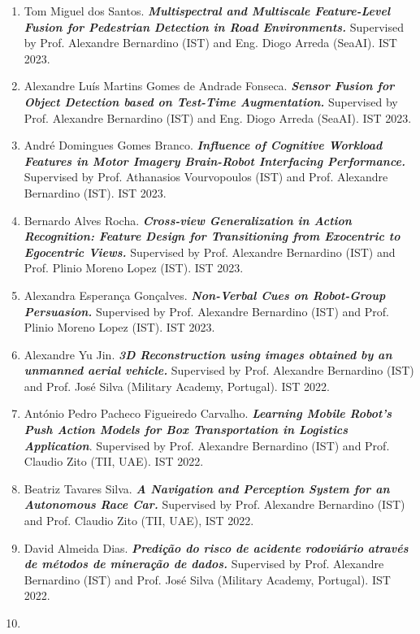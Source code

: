 \begin{enumerate}
{{  Mechanics.}} Supervised by Prof. Alexandre Bernardino (IST) and Prof.
  Rui Ferreira (IST). IST 2023.
\item
  Tom Miguel dos Santos. \emph{\textbf{Multispectral and Multiscale
  Feature-Level Fusion for Pedestrian Detection in Road Environments.}}
  Supervised by Prof. Alexandre Bernardino (IST) and Eng. Diogo Arreda
  (SeaAI). IST 2023.
\item
  Alexandre Luís Martins Gomes de Andrade Fonseca. \emph{\textbf{Sensor
  Fusion for Object Detection based on Test-Time Augmentation.}}
  Supervised by Prof. Alexandre Bernardino (IST) and Eng. Diogo Arreda
  (SeaAI). IST 2023.
\item
  André Domingues Gomes Branco. \emph{\textbf{Influence of Cognitive
  Workload Features in Motor Imagery Brain-Robot Interfacing
  Performance.}} Supervised by Prof. Athanasios Vourvopoulos (IST) and
  Prof. Alexandre Bernardino (IST). IST 2023.
\item
  Bernardo Alves Rocha. \emph{\textbf{Cross-view Generalization in
  Action Recognition: Feature Design for Transitioning from Exocentric
  to Egocentric Views.}} Supervised by Prof. Alexandre Bernardino (IST)
  and Prof. Plinio Moreno Lopez (IST). IST 2023.
\item
  Alexandra Esperança Gonçalves. \emph{\textbf{Non-Verbal Cues on
  Robot-Group Persuasion.}} Supervised by Prof. Alexandre Bernardino
  (IST) and Prof. Plinio Moreno Lopez (IST). IST 2023.
\item
  Alexandre Yu Jin. \emph{\textbf{3D Reconstruction using images
  obtained by an unmanned aerial vehicle.}} Supervised by Prof.
  Alexandre Bernardino (IST) and Prof. José Silva (Military Academy,
  Portugal). IST 2022.
\item
  António Pedro Pacheco Figueiredo Carvalho. \emph{\textbf{Learning
  Mobile Robot's Push Action Models for Box Transportation in Logistics
  Application}}. Supervised by Prof. Alexandre Bernardino (IST) and
  Prof. Claudio Zito (TII, UAE). IST 2022.
\item
  Beatriz Tavares Silva. \emph{\textbf{A Navigation and Perception
  System for an Autonomous Race Car.}} Supervised by Prof. Alexandre
  Bernardino (IST) and Prof. Claudio Zito (TII, UAE), IST 2022.
\item
  David Almeida Dias. \emph{\textbf{Predição do risco de acidente
  rodoviário através de métodos de mineração de dados.}} Supervised by
  Prof. Alexandre Bernardino (IST) and Prof. José Silva (Military
  Academy, Portugal). IST 2022.
\item

\end{enumerate}
